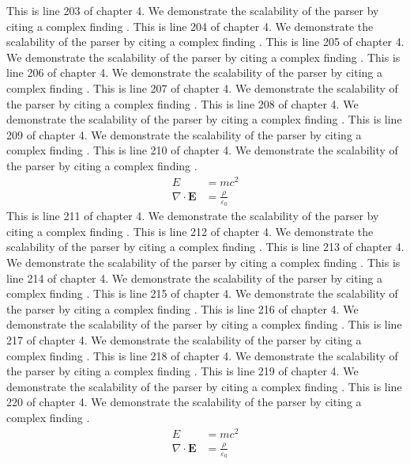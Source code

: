 This is line 203 of chapter 4. We demonstrate the scalability of the parser by citing a complex finding \cite{ref4_203}.
This is line 204 of chapter 4. We demonstrate the scalability of the parser by citing a complex finding \cite{ref4_204}.
This is line 205 of chapter 4. We demonstrate the scalability of the parser by citing a complex finding \cite{ref4_205}.
This is line 206 of chapter 4. We demonstrate the scalability of the parser by citing a complex finding \cite{ref4_206}.
This is line 207 of chapter 4. We demonstrate the scalability of the parser by citing a complex finding \cite{ref4_207}.
This is line 208 of chapter 4. We demonstrate the scalability of the parser by citing a complex finding \cite{ref4_208}.
This is line 209 of chapter 4. We demonstrate the scalability of the parser by citing a complex finding \cite{ref4_209}.
This is line 210 of chapter 4. We demonstrate the scalability of the parser by citing a complex finding \cite{ref4_210}.
\begin{align*}
  E &= mc^2 \\
  \nabla \cdot \mathbf{E} &= \frac{\rho}{\varepsilon_0}
\end{align*}
This is line 211 of chapter 4. We demonstrate the scalability of the parser by citing a complex finding \cite{ref4_211}.
This is line 212 of chapter 4. We demonstrate the scalability of the parser by citing a complex finding \cite{ref4_212}.
This is line 213 of chapter 4. We demonstrate the scalability of the parser by citing a complex finding \cite{ref4_213}.
This is line 214 of chapter 4. We demonstrate the scalability of the parser by citing a complex finding \cite{ref4_214}.
This is line 215 of chapter 4. We demonstrate the scalability of the parser by citing a complex finding \cite{ref4_215}.
This is line 216 of chapter 4. We demonstrate the scalability of the parser by citing a complex finding \cite{ref4_216}.
This is line 217 of chapter 4. We demonstrate the scalability of the parser by citing a complex finding \cite{ref4_217}.
This is line 218 of chapter 4. We demonstrate the scalability of the parser by citing a complex finding \cite{ref4_218}.
This is line 219 of chapter 4. We demonstrate the scalability of the parser by citing a complex finding \cite{ref4_219}.
This is line 220 of chapter 4. We demonstrate the scalability of the parser by citing a complex finding \cite{ref4_220}.
\begin{align*}
  E &= mc^2 \\
  \nabla \cdot \mathbf{E} &= \frac{\rho}{\varepsilon_0}
\end{align*}
